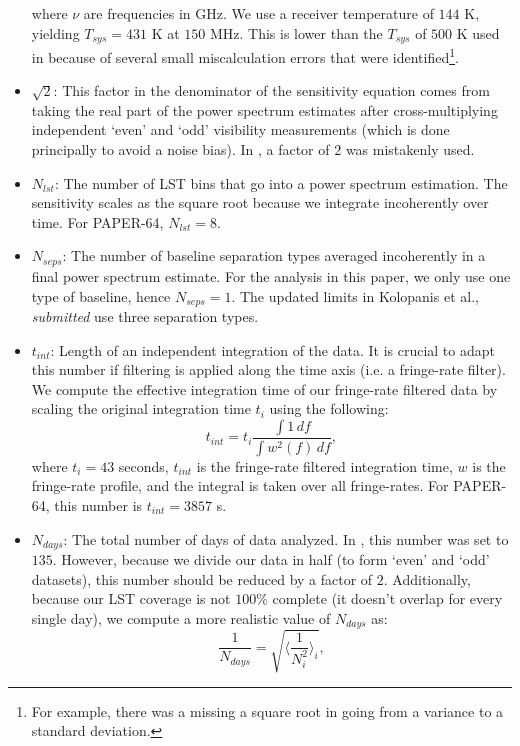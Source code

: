 \documentclass[preprint2,numberedappendix,tighten]{aastex6}  %
\begin{document}
\begin{itemize}
where $\nu$ are frequencies in GHz. We use a receiver temperature of $144$ K, yielding $T_{sys} = 431$ K at $150$ MHz. 
This is lower than the $T_{sys}$ of $500$ K used in  because of several small miscalculation errors that were 
identified\footnote{For example, there was a missing a square root in going from a variance to a standard deviation.}.
\item $\sqrt{2}$: This factor in the denominator of the sensitivity equation comes from taking the real part of the power spectrum 
estimates after cross-multiplying independent `even' and `odd' visibility measurements (which is done principally to avoid a noise bias). In , a factor of $2$ was mistakenly used.
\item $N_{lst}$: The number of LST bins that go into a power spectrum estimation. The sensitivity scales as the square root 
because we integrate incoherently over time. For PAPER-64, $N_{lst} = 8$.
\item $N_{seps}$: The number of baseline separation types averaged incoherently in a final power spectrum estimate. For the 
analysis in this paper, we only use one type of baseline, hence $N_{seps}=1$. The updated limits in Kolopanis et al., \textit{submitted}
use three separation types.
\item $t_{int}$: Length of an independent integration of the data. It is crucial to adapt this number if filtering is applied along the time axis (i.e. a 
fringe-rate filter). We compute the effective integration time of our fringe-rate filtered data by scaling the original integration time $t_{i}$
using the following:
\begin{equation}
t_{int} = t_{i} \frac{\int1 \, df}{\int w^{2}(f) \,df},
\end{equation}
where $t_{i}=43$ seconds, $t_{int}$ is the fringe-rate filtered integration time, $w$ is the fringe-rate profile, and the integral is 
taken over all fringe-rates. For PAPER-64, this number is $t_{int} = 3857$ s. 
\item $N_{days}$: The total number of days of data analyzed. In , this number was set to $135$. However, because we 
divide our data in half (to form `even' and `odd' datasets), this number should be reduced by a factor of $2$. Additionally, 
because our LST coverage is not $100\%$ complete (it doesn't overlap for every single day), we compute a more realistic value of 
$N_{days}$ as:
\begin{equation}
 \frac{1}{N_{days}} = \sqrt{\Big\langle\frac{1}{N_{i}^{2}} \Big\rangle_{i}},

\end{equation}
\end{itemize}
\end{document}

